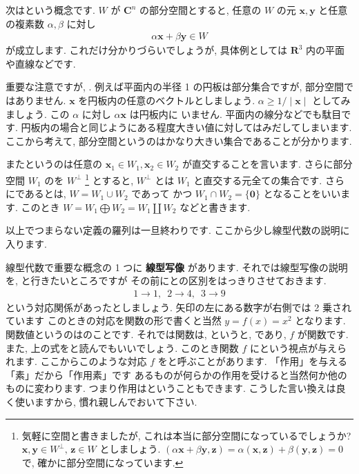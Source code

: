 \documentclass[openany, a4paper, oneside]{jsbook}
\theoremstyle{break}
\theoremstyle{breakdefn}
\begin{document}
次はという概念です.
 $W$ が $\bm{C}^n$ の部分空間とすると,
任意の $W$ の元 $\bm{x},\bm{y}$ と任意の複素数 $\alpha,\beta$ に対し
    \begin{align}
        \alpha \bm{x} + \beta \bm{y} \in W
    \end{align}
が成立します. これだけ分かりづらいでしょうが, 具体例としては $\bm{R}^3$ 内の平面や直線などです.

重要な注意ですが, .
例えば平面内の半径 1 の円板は部分集合ですが, 部分空間ではありません.
 $\bm{x}$ を円板内の任意のベクトルとしましょう.
 $\alpha \geq 1/\mid \bm{x} \mid$ としてみましょう. この $\alpha$ に対し $\alpha \bm{x}$ は円板内に
いません. 平面内の線分などでも駄目です. 円板内の場合と同じようにある程度大きい値に対してはみだしてしまいます.
ここから考えて, 部分空間というのはかなり大きい集合であることが分かります.

またというのは任意の $\bm{x}_1 \in W_1,\bm{x}_2 \in W_2$ が直交することを言います.
さらに部分空間 $W_1$ のを $W^{\perp}$ \footnote{気軽に空間と書きましたが, これは本当に部分空間になっているでしょうか?
$\bm{x},\bm{y} \in W^{\perp},\, \bm{z} \in W$ としましょう.
$(\alpha \bm{x} + \beta\bm{y},\bm{z}) = \alpha (\bm{x},\bm{z}) + \beta (\bm{y},\bm{z}) =0$
で, 確かに部分空間になっています.
 }
とすると,  $W^{\perp}$ とは
 $W_1$ と直交する元全ての集合です.
さらにであるとは,  $W = W_1 \cup W_2$ であって
かつ $W_1 \cap W_2 = \{ \bm{0} \}$ となることをいいます.
このとき $W = W_1 \bigoplus W_2 = W_1 \amalg W_2$ などと書きます.

以上でつまらない定義の羅列は一旦終わりです.
ここから少し線型代数の説明に入ります.

線型代数で重要な概念の 1 つに \textbf{線型写像} があります.
それでは線型写像の説明を, と行きたいところですが
その前にとの区別をはっきりさせておきます.
\begin{align}
1 \longrightarrow 1 ,\,\,\, 2 \longrightarrow 4 ,\,\,\, 3 \longrightarrow 9
\end{align}
という対応関係があったとしましょう. 矢印の左にある数字が右側では 2 乗されています
このときの対応を関数の形で書くと当然 $y = f (x) = x^{2}$ となります.
関数値というのはのことです. それでは関数は, というと,
であり,  $f$ が関数です.
また, 上の式をと読んでもいいでしょう.
このとき関数 $f$ にという視点が与えられます.
ここからこのような対応 $f$ をと呼ぶことがあります.
「作用」を与える「素」だから「作用素」です
あるものが何らかの作用を受けると当然何か他のものに変わります.
つまり作用はということもできます.
こうした言い換えは良く使いますから, 慣れ親しんでおいて下さい.
\end{document}
